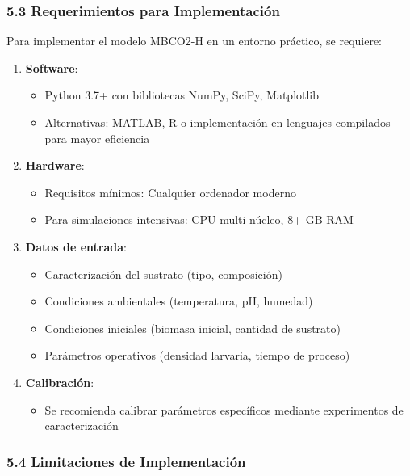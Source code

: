 \documentclass[
]{article}
\providecommand{\tightlist}{%
  \setlength{\itemsep}{0pt}\setlength{\parskip}{0pt}}
\begin{document}
\subsubsection{5.3 Requerimientos para
Implementación}\label{requerimientos-para-implementaciuxf3n}

Para implementar el modelo MBCO2-H en un entorno práctico, se requiere:

\begin{enumerate}
\def\labelenumi{\arabic{enumi}.}
\tightlist
\item
  \textbf{Software}:

  \begin{itemize}
  \tightlist
  \item
    Python 3.7+ con bibliotecas NumPy, SciPy, Matplotlib
  \item
    Alternativas: MATLAB, R o implementación en lenguajes compilados
    para mayor eficiencia
  \end{itemize}
\item
  \textbf{Hardware}:

  \begin{itemize}
  \tightlist
  \item
    Requisitos mínimos: Cualquier ordenador moderno
  \item
    Para simulaciones intensivas: CPU multi-núcleo, 8+ GB RAM
  \end{itemize}
\item
  \textbf{Datos de entrada}:

  \begin{itemize}
  \tightlist
  \item
    Caracterización del sustrato (tipo, composición)
  \item
    Condiciones ambientales (temperatura, pH, humedad)
  \item
    Condiciones iniciales (biomasa inicial, cantidad de sustrato)
  \item
    Parámetros operativos (densidad larvaria, tiempo de proceso)
  \end{itemize}
\item
  \textbf{Calibración}:

  \begin{itemize}
  \tightlist
  \item
    Se recomienda calibrar parámetros específicos mediante experimentos
    de caracterización
  \end{itemize}
\end{enumerate}

\subsubsection{5.4 Limitaciones de
Implementación}\label{limitaciones-de-implementaciuxf3n}
\end{document}
